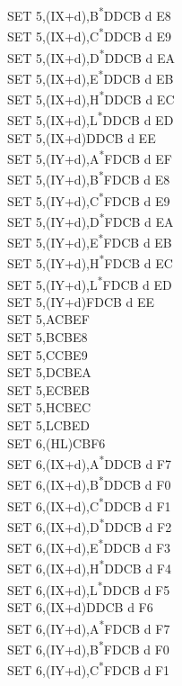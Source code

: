 \documentclass[twoside,openright,a4paper]{book}
\begin{document}
\begin{multicols}{3}
{\begin{tabbing}
	SET 5,(IX+d),B\textsuperscript{*}\>DDCB d E8\\
	SET 5,(IX+d),C\textsuperscript{*}\>DDCB d E9\\
	SET 5,(IX+d),D\textsuperscript{*}\>DDCB d EA\\
	SET 5,(IX+d),E\textsuperscript{*}\>DDCB d EB\\
	SET 5,(IX+d),H\textsuperscript{*}\>DDCB d EC\\
	SET 5,(IX+d),L\textsuperscript{*}\>DDCB d ED\\
	SET 5,(IX+d)\>DDCB d EE\\
	SET 5,(IY+d),A\textsuperscript{*}\>FDCB d EF\\
	SET 5,(IY+d),B\textsuperscript{*}\>FDCB d E8\\
	SET 5,(IY+d),C\textsuperscript{*}\>FDCB d E9\\
	SET 5,(IY+d),D\textsuperscript{*}\>FDCB d EA\\
	SET 5,(IY+d),E\textsuperscript{*}\>FDCB d EB\\
	SET 5,(IY+d),H\textsuperscript{*}\>FDCB d EC\\
	SET 5,(IY+d),L\textsuperscript{*}\>FDCB d ED\\
	SET 5,(IY+d)\>FDCB d EE\\
	SET 5,A\>CBEF\\
	SET 5,B\>CBE8\\
	SET 5,C\>CBE9\\
	SET 5,D\>CBEA\\
	SET 5,E\>CBEB\\
	SET 5,H\>CBEC\\
	SET 5,L\>CBED\\
	SET 6,(HL)\>CBF6\\
	SET 6,(IX+d),A\textsuperscript{*}\>DDCB d F7\\
	SET 6,(IX+d),B\textsuperscript{*}\>DDCB d F0\\
	SET 6,(IX+d),C\textsuperscript{*}\>DDCB d F1\\
	SET 6,(IX+d),D\textsuperscript{*}\>DDCB d F2\\
	SET 6,(IX+d),E\textsuperscript{*}\>DDCB d F3\\
	SET 6,(IX+d),H\textsuperscript{*}\>DDCB d F4\\
	SET 6,(IX+d),L\textsuperscript{*}\>DDCB d F5\\
	SET 6,(IX+d)\>DDCB d F6\\
	SET 6,(IY+d),A\textsuperscript{*}\>FDCB d F7\\
	SET 6,(IY+d),B\textsuperscript{*}\>FDCB d F0\\
	SET 6,(IY+d),C\textsuperscript{*}\>FDCB d F1\\

\end{tabbing}}
\end{multicols}
\end{document}
